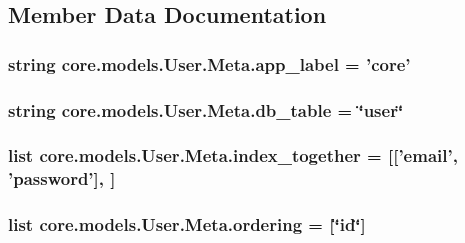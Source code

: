 \subsection{Member Data Documentation}
\hypertarget{classcore_1_1models_1_1User_1_1Meta_a312a6b6a4a93e43adee50a61c279d86e}{
\subsubsection[{app\-\_\-label}]{\setlength{\rightskip}{0pt plus 5cm}string core.\-models.\-User.\-Meta.\-app\-\_\-label = 'core'\hspace{0.3cm}{\ttfamily [static]}}}\label{classcore_1_1models_1_1User_1_1Meta_a312a6b6a4a93e43adee50a61c279d86e}
\hypertarget{classcore_1_1models_1_1User_1_1Meta_ad3d032af082ac2317f021e5f82d99a73}{
\subsubsection[{db\-\_\-table}]{\setlength{\rightskip}{0pt plus 5cm}string core.\-models.\-User.\-Meta.\-db\-\_\-table = \char`\"{}user\char`\"{}\hspace{0.3cm}{\ttfamily [static]}}}\label{classcore_1_1models_1_1User_1_1Meta_ad3d032af082ac2317f021e5f82d99a73}
\hypertarget{classcore_1_1models_1_1User_1_1Meta_af53601dbe2102af20c257ae3f2421ca7}{
\subsubsection[{index\-\_\-together}]{\setlength{\rightskip}{0pt plus 5cm}list core.\-models.\-User.\-Meta.\-index\-\_\-together = \mbox{[}\mbox{[}'{\bf email}', '{\bf password}'\mbox{]}, \mbox{]}\hspace{0.3cm}{\ttfamily [static]}}}\label{classcore_1_1models_1_1User_1_1Meta_af53601dbe2102af20c257ae3f2421ca7}
\hypertarget{classcore_1_1models_1_1User_1_1Meta_a1735861228e6e42d23989ddf97d22c60}{
\subsubsection[{ordering}]{\setlength{\rightskip}{0pt plus 5cm}list core.\-models.\-User.\-Meta.\-ordering = \mbox{[}\char`\"{}id\char`\"{}\mbox{]}\hspace{0.3cm}{\ttfamily [static]}}}\label{classcore_1_1models_1_1User_1_1Meta_a1735861228e6e42d23989ddf97d22c60}
